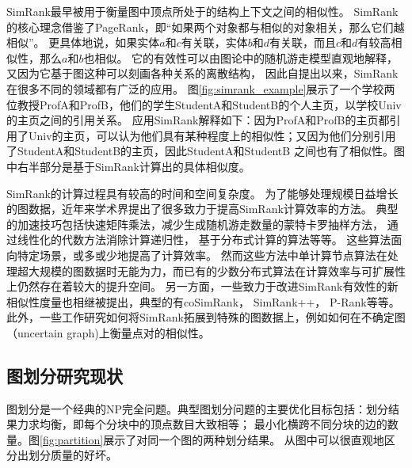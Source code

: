 \documentclass[master]{njuthesis}
\begin{document}
SimRank\cite{jeh2002simrank}最早被用于衡量图中顶点所处于的结构上下文之间的相似性。
SimRank的核心理念借鉴了PageRank\cite{page1999pagerank}，即“如果两个对象都与相似的对象相关，那么它们越相似”。
更具体地说，如果实体$a$和$c$有关联，实体$b$和$d$有关联，而且$c$和$d$有较高相似性，那么$a$和$b$也相似。
它的有效性可以由图论中的随机游走模型直观地解释，又因为它基于图这种可以刻画各种关系的离散结构，
因此自提出以来，SimRank在很多不同的领域都有广泛的应用。
图\ref{fig:simrank_example}展示了一个学校两位教授ProfA和ProfB，他们的学生StudentA和StudentB的个人主页，以学校Univ的主页之间的引用关系。
应用SimRank解释如下：因为ProfA和ProfB的主页都引用了Univ的主页，可以认为他们具有某种程度上的相似性；又因为他们分别引用了StudentA和StudentB的主页，因此StudentA和StudentB
之间也有了相似性。图中右半部分是基于SimRank计算出的具体相似度。

SimRank的计算过程具有较高的时间和空间复杂度。
为了能够处理规模日益增长的图数据，近年来学术界提出了很多致力于提高SimRank计算效率的方法。
典型的加速技巧包括快速矩阵乘法\cite{yu2012space}，减少生成随机游走数量的蒙特卡罗抽样方法\cite{kusumoto2014scalable}，
通过线性化的代数方法消除计算递归性\cite{DBLP:journals/corr/MaeharaKK14}，
基于分布式计算的算法\cite{cao2012delta}等等。
这些算法面向特定场景，或多或少地提高了计算效率。
然而这些方法中单计算节点算法在处理超大规模的图数据时无能为力，而已有的少数分布式算法在计算效率与可扩展性上仍然存在着较大的提升空间。
另一方面，一些致力于改进SimRank有效性的新相似性度量也相继被提出，典型的有coSimRank\cite{DBLP:conf/acl/RotheS14}，
SimRank++\cite{DBLP:journals/pvldb/AntonellisGC08}，
P-Rank\cite{DBLP:conf/cikm/ZhaoHS09}等等。
此外，一些工作研究如何将SimRank拓展到特殊的图数据上，例如如何在不确定图\cite{DBLP:conf/icde/ZhuZL16}（uncertain graph)上衡量点对的相似性。

\subsection{图划分研究现状}
图划分是一个经典的NP完全问题。典型图划分问题的主要优化目标包括：划分结果力求均衡，即每个分块中的顶点数目大致相等；
最小化横跨不同分块的边的数量。图\ref{fig:partition}展示了对同一个图的两种划分结果。
从图中可以很直观地区分出划分质量的好坏。
\end{document}
